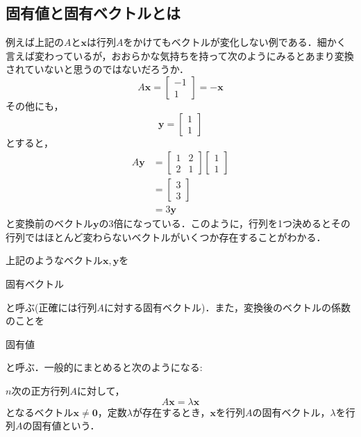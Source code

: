 \documentclass[a4paper,12pt,autodetect-engine,dvipdfmx]{jsarticle}
\theoremstyle{definition}
\begin{document}
\subsection{固有値と固有ベクトルとは}
例えば上記の$A$と$\bm{x}$は行列$A$をかけてもベクトルが変化しない例である．細かく言えば変わっているが，おおらかな気持ちを持って次のようにみるとあまり変換されていないと思うのではないだろうか．
\begin{equation*}
    A \bm{x}=
    \begin{bmatrix}
        -1\\
        1
    \end{bmatrix}
    =
    - \bm{x}
\end{equation*}
その他にも，
\begin{equation*}
    \bm{y}=
    \begin{bmatrix}
        1\\
        1
    \end{bmatrix}
\end{equation*}
とすると，
\begin{align*}
    A \bm{y}
    &=
    \begin{bmatrix}
        1 & 2\\
        2 & 1
    \end{bmatrix}
    \begin{bmatrix}
        1\\
        1
    \end{bmatrix}\\
    &=
    \begin{bmatrix}
        3\\
        3
    \end{bmatrix}\\
    &=
    3 \bm{y}
\end{align*}
と変換前のベクトル$\bm{y}$の3倍になっている．このように，行列を1つ決めるとその行列ではほとんど変わらないベクトルがいくつか存在することがわかる．

上記のようなベクトル$\bm{x},\bm{y}$を
\begin{center}
    固有ベクトル
\end{center}
と呼ぶ(正確には行列$A$に対する固有ベクトル)．また，変換後のベクトルの係数のことを
\begin{center}
    固有値
\end{center}
と呼ぶ．一般的にまとめると次のようになる:

$n$次の正方行列$A$に対して，
\begin{equation*}
    A \bm{x} = \lambda \bm{x}
\end{equation*}
となるベクトル$\bm{x} \neq \bm{0}$，定数$\lambda$が存在するとき，$\bm{x}$を行列$A$の固有ベクトル，$\lambda$を行列$A$の固有値という．
\end{document}
